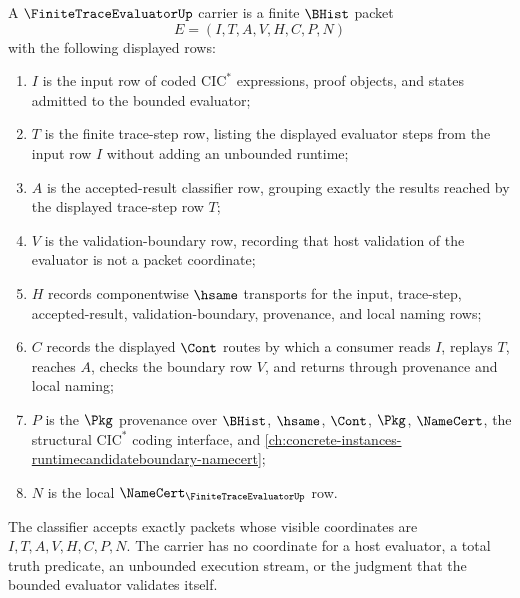 \begin{definition}
\label{def:finite-trace-evaluator-carrier}
A $\FiniteTraceEvaluatorUp$ carrier is a finite $\BHist$ packet
$$
E=(I,T,A,V,H,C,P,N)
$$
with the following displayed rows:
\begin{enumerate}
\item $I$ is the input row of coded $\mathrm{CIC}^{*}$ expressions, proof objects, and states admitted to the bounded evaluator;
\item $T$ is the finite trace-step row, listing the displayed evaluator steps from the input row $I$ without adding an unbounded runtime;
\item $A$ is the accepted-result classifier row, grouping exactly the results reached by the displayed trace-step row $T$;
\item $V$ is the validation-boundary row, recording that host validation of the evaluator is not a packet coordinate;
\item $H$ records componentwise $\hsame$ transports for the input, trace-step, accepted-result, validation-boundary, provenance, and local naming rows;
\item $C$ records the displayed $\Cont$ routes by which a consumer reads $I$, replays $T$, reaches $A$, checks the boundary row $V$, and returns through provenance and local naming;
\item $P$ is the $\Pkg$ provenance over $\BHist$, $\hsame$, $\Cont$, $\Pkg$, $\NameCert$, the structural $\mathrm{CIC}^{*}$ coding interface, and \autoref{ch:concrete-instances-runtimecandidateboundary-namecert};
\item $N$ is the local $\NameCert_{\FiniteTraceEvaluatorUp}$ row.
\end{enumerate}
The classifier accepts exactly packets whose visible coordinates are $I,T,A,V,H,C,P,N$. The carrier has no coordinate for a host evaluator, a total truth predicate, an unbounded execution stream, or the judgment that the bounded evaluator validates itself.
\end{definition}

